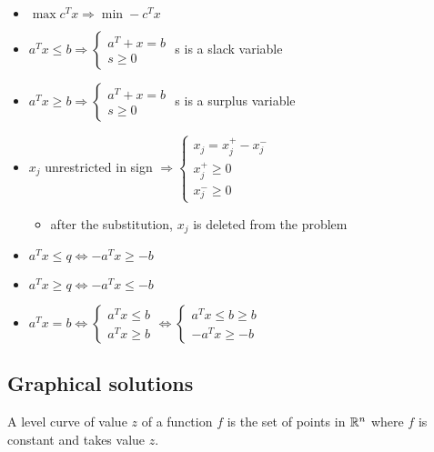 \documentclass[english]{article}
\begin{document}
\begin{itemize}[parsep=1.25ex]
  \item \(\max c^T x \Rightarrow \min -c^T x\)
  \item \(a^T x \leq b \Rightarrow \begin{cases}
          a^T + x = b \\
          s \geq 0
        \end{cases}\) s is a slack variable
  \item \(a^T x \geq b \Rightarrow \begin{cases}
          a^T + x = b \\
          s \geq 0
        \end{cases}\) s is a surplus variable
  \item \(x_j\) unrestricted in sign \(\Rightarrow \begin{cases}
          x_j = x_j^+ - x_j^- \\
          x_j^+ \geq 0        \\
          x_j^- \geq 0
        \end{cases}\)
        \begin{itemize}[label=\(\rightarrow\)]
          \item after the substitution, \(x_j\) is deleted from the problem
        \end{itemize}
  \item \(a^T x \leq q \Leftrightarrow - a^T x \geq -b\)
  \item \(a^T x \geq q \Leftrightarrow - a^T x \leq -b\)
  \item \(a^T x = b \Leftrightarrow \begin{cases}
          a^T x \leq b \\
          a^T x \geq b
        \end{cases} \Leftrightarrow \begin{cases}
          a^T x \leq b \geq b \\
          -  a^T x \geq - b
        \end{cases}\)
\end{itemize}

\subsection{Graphical solutions}

A level curve of value \(z\) of a function \(f\) is the set of points in \(\mathbb{R}^n\) where \(f\) is constant and takes value \(z\).
\end{document}
